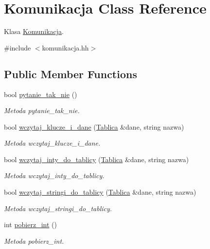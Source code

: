 \hypertarget{class_komunikacja}{\section{Komunikacja Class Reference}
\label{class_komunikacja}
}


Klasa \hyperlink{class_komunikacja}{Komunikacja}.  




{\ttfamily \#include $<$komunikacja.\-hh$>$}

\subsection*{Public Member Functions}
\begin{DoxyCompactItemize}
\item 
bool \hyperlink{class_komunikacja_a22554e7095eccc02f899a5022382fe0e}{pytanie\-\_\-tak\-\_\-nie} ()
\begin{DoxyCompactList}\small\item\em Metoda pytanie\-\_\-tak\-\_\-nie. \end{DoxyCompactList}\item 
bool \hyperlink{class_komunikacja_a94497dd3cdaa7f52355e8edb0ca854b4}{wczytaj\-\_\-klucze\-\_\-i\-\_\-dane} (\hyperlink{class_tablica}{Tablica} \&dane, string nazwa)
\begin{DoxyCompactList}\small\item\em Metoda wczytaj\-\_\-klucze\-\_\-i\-\_\-dane. \end{DoxyCompactList}\item 
bool \hyperlink{class_komunikacja_a584a632826e92cf838e64368b8abbe05}{wczytaj\-\_\-inty\-\_\-do\-\_\-tablicy} (\hyperlink{class_tablica}{Tablica} \&dane, string nazwa)
\begin{DoxyCompactList}\small\item\em Metoda wczytaj\-\_\-inty\-\_\-do\-\_\-tablicy. \end{DoxyCompactList}\item 
bool \hyperlink{class_komunikacja_a72e1facbd11615a383ed799d490aed52}{wczytaj\-\_\-stringi\-\_\-do\-\_\-tablicy} (\hyperlink{class_tablica}{Tablica} \&dane, string nazwa)
\begin{DoxyCompactList}\small\item\em Metoda wczytaj\-\_\-stringi\-\_\-do\-\_\-tablicy. \end{DoxyCompactList}\item 
int \hyperlink{class_komunikacja_a28d01913291afd05c5069182fd29506b}{pobierz\-\_\-int} ()
\begin{DoxyCompactList}\small\item\em Metoda pobierz\-\_\-int. \end{DoxyCompactList}\end{DoxyCompactItemize}



